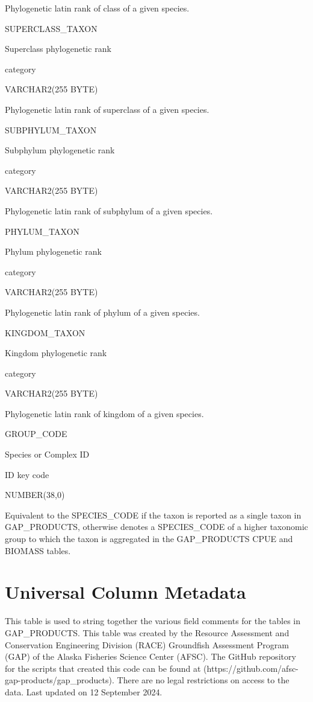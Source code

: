 \documentclass[
  letterpaper,
  oneside,
  open=any]{scrbook}
\begin{document}
Phylogenetic latin rank of class of a given species.

SUPERCLASS\_TAXON

Superclass phylogenetic rank

category

VARCHAR2(255 BYTE)

Phylogenetic latin rank of superclass of a given species.

SUBPHYLUM\_TAXON

Subphylum phylogenetic rank

category

VARCHAR2(255 BYTE)

Phylogenetic latin rank of subphylum of a given species.

PHYLUM\_TAXON

Phylum phylogenetic rank

category

VARCHAR2(255 BYTE)

Phylogenetic latin rank of phylum of a given species.

KINGDOM\_TAXON

Kingdom phylogenetic rank

category

VARCHAR2(255 BYTE)

Phylogenetic latin rank of kingdom of a given species.

GROUP\_CODE

Species or Complex ID

ID key code

NUMBER(38,0)

Equivalent to the SPECIES\_CODE if the taxon is reported as a single
taxon in GAP\_PRODUCTS, otherwise denotes a SPECIES\_CODE of a higher
taxonomic group to which the taxon is aggregated in the GAP\_PRODUCTS
CPUE and BIOMASS tables.

\chapter{Universal Column Metadata}\label{universal-column-metadata}

This table is used to string together the various field comments for the
tables in GAP\_PRODUCTS. This table was created by the Resource
Assessment and Conservation Engineering Division (RACE) Groundfish
Assessment Program (GAP) of the Alaska Fisheries Science Center (AFSC).
The GitHub repository for the scripts that created this code can be
found at (https://github.com/afsc-gap-products/gap\_products). There are
no legal restrictions on access to the data. Last updated on 12
September 2024.
\end{document}
